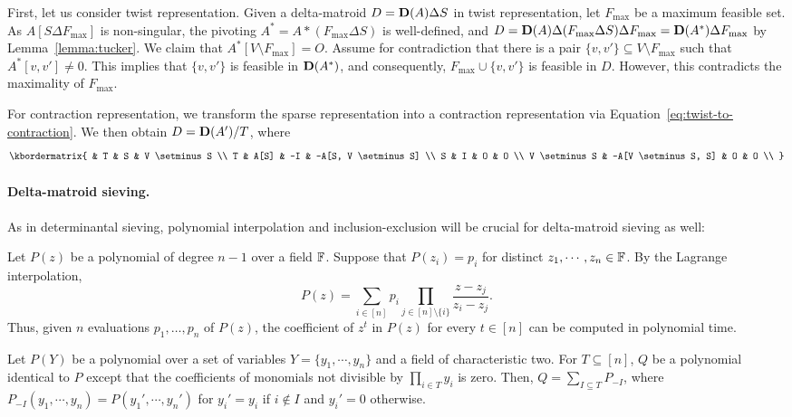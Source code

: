 First, let us consider twist representation.
Given a delta-matroid $D = \mathbf D(A) \Delta S$ in twist representation, let $F_{\max}$ be a maximum feasible set. 
As $A[S \Delta F_{\max}]$ is non-singular, the pivoting $A^* = A * (F_{\max} \Delta S)$ is well-defined, and $D = \mathbf D(A) \Delta (F_{\max} \Delta S) \Delta F_{\max} = \mathbf D(A^*) \Delta F_{\max}$ by Lemma~\ref{lemma:tucker}.
We claim that $A^*[V \setminus F_{\max}] = O$.
Assume for contradiction that there is a pair $\{ v, v' \} \subseteq V \setminus F_{\max}$ such that $A^*[v, v'] \ne 0$.
This implies that $\{ v, v' \}$ is feasible in $\mathbf D(A^*)$, and consequently, $F_{\max} \cup \{ v, v' \}$ is feasible in $D$.
However, this contradicts the maximality of $F_{\max}$.

For contraction representation, we
transform the sparse representation into a contraction representation via Equation~\eqref{eq:twist-to-contraction}.
We then obtain $D = \mathbf D(A') / T$, where
\begin{align*}
  \kbordermatrix{
    & T & S & V \setminus S \\
    T & A[S] & -I & -A[S, V \setminus S] \\
    S & I & O & O \\
    V \setminus S & -A[V \setminus S, S] & O & O \\
  }
\end{align*}

\paragraph*{Delta-matroid sieving.}

As in determinantal sieving, polynomial interpolation and inclusion-exclusion will be crucial for delta-matroid sieving as well:

\begin{lemma}[Interpolation]
  \label{lemma:interpolation}
  Let $P(z)$ be a polynomial of degree $n - 1$ over a field $\mathbb F$.
  Suppose that $P(z_i) = p_i$ for distinct $z_1, \cdots, z_n \in \mathbb F$.
  By the Lagrange interpolation, 
  \[
    P(z)
    = \sum_{i \in [n]} p_i \prod_{j \in [n] \setminus \{ i \}} \frac{z - z_j}{z_i - z_j}.
  \]
  Thus, given $n$ evaluations $p_1, \dots, p_n$ of $P(z)$, the coefficient of $z^t$ in $P(z)$ for every $t \in [n]$ can be computed in polynomial time.
\end{lemma}

\begin{lemma}
  \label{lemma:inclusion-exclusion}
  Let $P(Y)$ be a polynomial over a set of variables $Y = \{ y_1, \cdots, y_n \}$ and a field of characteristic two.
  For $T \subseteq [n]$, $Q$ be a polynomial identical to $P$ except that the coefficients of monomials not divisible by $\prod_{i \in T} y_i$ is zero.
  Then, $Q = \sum_{I \subseteq T} P_{-I}$, where $P_{-I}(y_1, \cdots, y_n) = P(y_1', \cdots, y_n')$ for $y_i' = y_i$ if $i \notin I$ and $y_i' = 0$ otherwise. 
\end{lemma}

